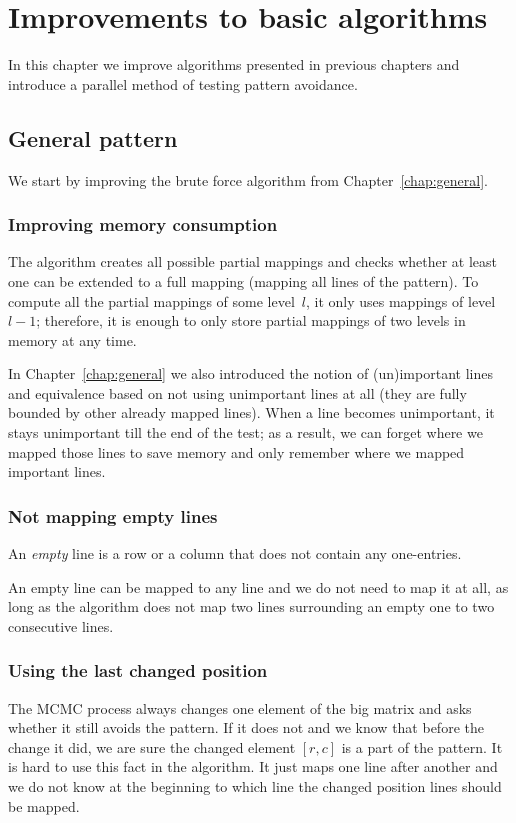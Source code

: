 \chapter{Improvements to basic algorithms}
\label{chap:imp}
In this chapter we improve algorithms presented in previous chapters and introduce a parallel method of testing pattern avoidance.

\section{General pattern}
We start by improving the brute force algorithm from Chapter~\ref{chap:general}.

\subsection{Improving memory consumption}
The algorithm creates all possible partial mappings and checks whether at least one can be extended to a full mapping (mapping all lines of the pattern). To compute all the partial mappings of some level~$l$, it only uses mappings of level~$l-1$; therefore, it is enough to only store partial mappings of two levels in memory at any time.

In Chapter~\ref{chap:general} we also introduced the notion of (un)important lines and equivalence based on not using unimportant lines at all (they are fully bounded by other already mapped lines). When a line becomes unimportant, it stays unimportant till the end of the test; as a result, we can forget where we mapped those lines to save memory and only remember where we mapped important lines.

\subsection{Not mapping empty lines}
\begin{defn}
An \emph{empty} line is a row or a column that does not contain any one-entries.
\end{defn}
An empty line can be mapped to any line and we do not need to map it at all, as long as the algorithm does not map two lines surrounding an empty one to two consecutive lines.

\subsection{Using the last changed position}
The MCMC process always changes one element of the big matrix and asks whether it still avoids the pattern. If it does not and we know that before the change it did, we are sure the changed element $[r,c]$ is a part of the pattern. It is hard to use this fact in the algorithm. It just maps one line after another and we do not know at the beginning to which line the changed position lines should be mapped.

